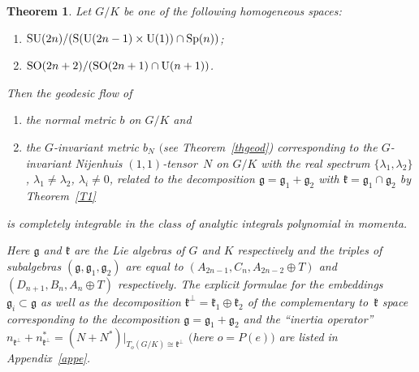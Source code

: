 \documentclass[10pt,a4paper]{amsart}
\numberwithin{equation}{section}
\newtheorem{Theorem}{Theorem}[section]
\begin{document}
\begin{Theorem}\label{appl} Let $G/K$ be one of the following homogeneous spaces:
\begin{enumerate}\itemsep=0pt
\item[$(a)$] ${\rm SU}(2n)/({\rm S}({\rm U}(2n-1)\times {\rm U}(1))\cap {\rm Sp}(n))$;
\item[$(b)$] ${\rm SO}(2n+2)/({\rm SO}(2n+1)\cap {\rm U}(n+1))$.
\end{enumerate}
Then the geodesic flow of
\begin{enumerate}\itemsep=0pt
\item[$1)$] the normal metric $b$ on $G/K$ and
\item[$2)$] the $G$-invariant metric $b_N$ $($see Theorem~{\rm \ref{thgeod})} corresponding to the $G$-invariant Nijenhuis $(1,1)$-tensor~$N$ on $G/K$ with the real spectrum $\{\lambda_1,\lambda_2\}$, $\lambda_1\not=\lambda_2$, $\lambda_i\not=0$, related to the decomposition $\mathfrak{g}=\mathfrak{g}_1+\mathfrak{g}_2$ with $\mathfrak{k}=\mathfrak{g}_1\cap\mathfrak{g}_2$ by Theorem~{\rm \ref{T1}}
 \end{enumerate}
is completely integrable in the class of analytic integrals polynomial in momenta.

Here $\mathfrak{g}$ and $\mathfrak{k}$ are the Lie algebras of $G$ and $K$ respectively and the triples of subalgebras $(\mathfrak{g},\mathfrak{g}_1,\mathfrak{g}_2)$ are equal to $(A_{2n-1},C_n,A_{2n-2}\oplus T)$ and $(D_{n+1},B_n,A_n\oplus T)$ respectively. The explicit formulae for the embeddings $\mathfrak{g}_i\subset \mathfrak{g}$ as well as the decomposition $\mathfrak{k}^\perp=\mathfrak{k}_1\oplus\mathfrak{k}_2$ of the complementary to~$\mathfrak{k}$ space corresponding to the decomposition $\mathfrak{g}=\mathfrak{g}_1+\mathfrak{g}_2$ and the ``inertia operator'' $n_{\mathfrak{k}^\perp}+n_{\mathfrak{k}^\perp}^*=(N+N^*)|_{T_o(G/K)\cong \mathfrak{k}^\perp}$ $($here $o=P(e))$ are listed in Appendix~{\rm \ref{appe}}.
\end{Theorem}
\end{document}
